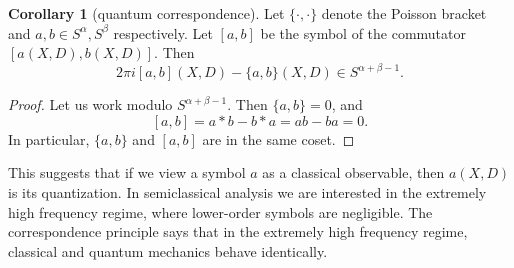 \documentclass[12pt]{report}
\theoremstyle{definition}
\newtheorem{corollary}[theorem]{Corollary}
\begin{document}
\begin{corollary}[quantum correspondence]
Let $\{\cdot,\cdot\}$ denote the Poisson bracket and $a, b \in S^\alpha,S^\beta$ respectively. Let $[a, b]$ be the symbol of the commutator $[a(X, D), b(X, D)]$. Then
$$2\pi i[a, b](X, D) - \{a, b\}(X, D) \in S^{\alpha + \beta - 1}.$$
\end{corollary}
\begin{proof}
Let us work modulo $S^{\alpha + \beta - 1}$. Then $\{a, b\} = 0$, and
$$[a, b] = a*b - b*a = ab - ba = 0.$$
In particular, $\{a, b\}$ and $[a, b]$ are in the same coset.
\end{proof}
This suggests that if we view a symbol $a$ as a classical observable, then $a(X, D)$ is its quantization.
In semiclassical analysis we are interested in the extremely high frequency regime, where lower-order symbols are negligible.
The correspondence principle says that in the extremely high frequency regime, classical and quantum mechanics behave identically.
\end{document}
